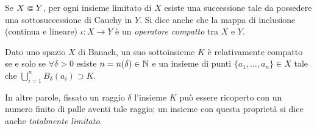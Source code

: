 Se $X\Subset Y$, per ogni insieme limitato di $X$ esiste una successione tale da possedere una sottosuccessione di Cauchy in $Y$.
Si dice anche che la mappa di inclusione (continua e lineare) $\iota\colon X\to Y$ è un \emph{operatore compatto} tra $X$ e $Y$.
\begin{teorema} \label{t:relativamente-compatto-sse-totalmente-limitato}
    Dato uno spazio $X$ di Banach, un suo sottoinsieme $K$ è relativamente compatto se e solo se $\forall\delta>0$ esiste $n=n(\delta)\in\mathbb{N}$ e un insieme di punti $\{a_1,\dotsc,a_n\}\in X$ tale che $\bigcup_{i=1}^n B_\delta(a_i)\supset K$.
\end{teorema}
In altre parole, fissato un raggio $\delta$ l'insieme $K$ può essere ricoperto con un numero finito di palle aventi tale raggio; un insieme con questa proprietà si dice anche \emph{totalmente limitato}.

